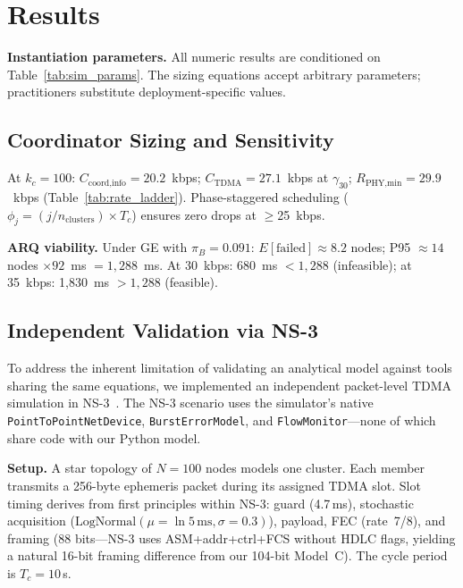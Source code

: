 \documentclass[journal]{IEEEtran}
\begin{document}
\section{Results}

\textbf{Instantiation parameters.} All numeric results are conditioned on Table~\ref{tab:sim_params}. The sizing equations accept arbitrary parameters; practitioners substitute deployment-specific values.

\subsection{Coordinator Sizing and Sensitivity}

At $k_c = 100$: $C_{\text{coord,info}} = 20.2$~kbps; $C_{\text{TDMA}} = 27.1$~kbps at $\gamma_{30}$; $R_{\text{PHY,min}} = 29.9$~kbps (Table~\ref{tab:rate_ladder}). Phase-staggered scheduling ($\phi_j = (j / n_{\text{clusters}}) \times T_c$) ensures zero drops at $\geq$25~kbps.

\textbf{ARQ viability.} Under GE with $\pi_B = 0.091$: $E[\text{failed}] \approx 8.2$ nodes; P95 $\approx 14$ nodes $\times 92$~ms $= 1{,}288$~ms. At 30~kbps: 680~ms $< 1{,}288$ (infeasible); at 35~kbps: 1,830~ms $> 1{,}288$ (feasible).

\subsection{Independent Validation via NS-3}
\label{sec:ns3-validation}

To address the inherent limitation of validating an analytical model against tools sharing the same equations, we implemented an independent packet-level TDMA simulation in NS-3~\cite{ns3}. The NS-3 scenario uses the simulator's native \texttt{PointToPointNetDevice}, \texttt{BurstErrorModel}, and \texttt{FlowMonitor}---none of which share code with our Python model.

\textbf{Setup.} A star topology of $N{=}100$ nodes models one cluster. Each member transmits a 256-byte ephemeris packet during its assigned TDMA slot. Slot timing derives from first principles within NS-3: guard (4.7\,ms), stochastic acquisition ($\mathrm{LogNormal}(\mu{=}\ln 5\,\mathrm{ms},\sigma{=}0.3)$), payload, FEC (rate~7/8), and framing (88 bits---NS-3 uses ASM+addr+ctrl+FCS without HDLC flags, yielding a natural 16-bit framing difference from our 104-bit Model~C). The cycle period is $T_c{=}10$\,s.
\end{document}

